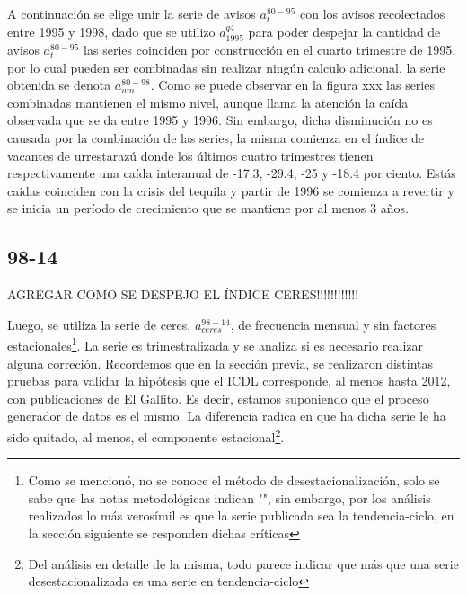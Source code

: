 \documentclass[12pt,twoside]{reedthesis}
\begin{document}
A continuación se elige unir la serie de avisos \(a_t^{80-95}\) con los avisos recolectados entre 1995 y 1998, dado que se utilizo \(a_{1995}^{q4}\) para poder despejar la cantidad de avisos \(a_t^{80-95}\) las series coinciden por construcción en el cuarto trimestre de 1995, por lo cual pueden ser combinadas sin realizar ningún calculo adicional, la serie obtenida se denota \(a_{um}^{80-98}\). Como se puede observar en la figura xxx las series combinadas mantienen el mismo nivel, aunque llama la atención la caída observada que se da entre 1995 y 1996. Sin embargo, dicha disminución no es causada por la combinación de las series, la misma comienza en el índice de vacantes de urrestarazú donde los últimos cuatro trimestres tienen respectivamente una caída interanual de -17.3, -29.4, -25 y -18.4 por ciento. Estás caídas coinciden con la crisis del tequila y partir de 1996 se comienza a revertir y se inicia un período de crecimiento que se mantiene por al menos 3 años.

\hypertarget{section-2}{%
\subsection{98-14}\label{section-2}}

AGREGAR COMO SE DESPEJO EL ÍNDICE CERES!!!!!!!!!!!!

Luego, se utiliza la serie de ceres, \(a_{ceres}^{98-14}\), de frecuencia mensual y sin factores estacionales\footnote{Como se mencionó, no se conoce el método de desestacionalización, solo se sabe que las notas metodológicas indican "", sin embargo, por los análisis realizados lo más verosímil es que la serie publicada sea la tendencia-ciclo, en la sección siguiente se responden dichas críticas}.
La serie es trimestralizada y se analiza si es necesario realizar alguna correción. Recordemos que en la sección previa, se realizaron distintas pruebas para validar la hipótesis que el ICDL corresponde, al menos hasta 2012, con publicaciones de El Gallito. Es decir, estamos suponiendo que el proceso generador de datos es el mismo. La diferencia radica en que ha dicha serie le ha sido quitado, al menos, el componente estacional\footnote{Del análisis en detalle de la misma, todo parece indicar que más que una serie desestacionalizada es una serie en tendencia-ciclo}.
\end{document}

